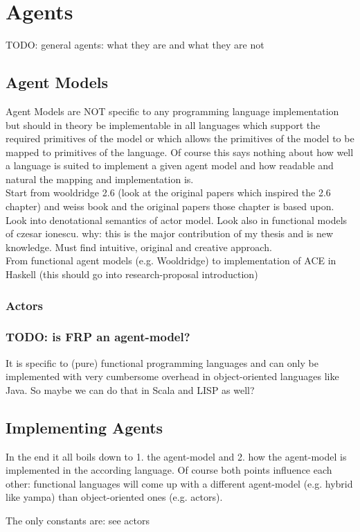 \chapter{Agents}

TODO: general agents: what they are and what they are not


\section{Agent Models}
Agent Models are NOT specific to any programming language implementation but should in theory be implementable in all languages which support the required primitives of the model or which allows the primitives of the model to be mapped to primitives of the language. Of course this says nothing about how well a language is suited to implement a given agent model and how readable and natural the mapping and implementation is. \\

Start from wooldridge 2.6 (look at the original papers which inspired the 2.6 chapter) and weiss book and the original papers those chapter is based upon. Look into denotational semantics of actor model. Look also in functional models of czesar ionescu. why: this is the major contribution of my thesis and is new knowledge. Must find intuitive, original and creative approach. \\
From functional agent models (e.g. Wooldridge) to implementation of ACE in Haskell (this should go into research-proposal introduction)

\subsection{Actors}

\subsection{TODO: is FRP an agent-model?}
It is specific to (pure) functional programming languages and can only be implemented with very cumbersome overhead in object-oriented languages like Java.
So maybe we can do that in Scala and LISP as well?

\section{Implementing Agents}
In the end it all boils down to 1. the agent-model and 2. how the agent-model is implemented in the according language. Of course both points influence each other: functional languages will come up with a different agent-model (e.g. hybrid like yampa) than object-oriented ones (e.g. actors).

The only constants are: see actors